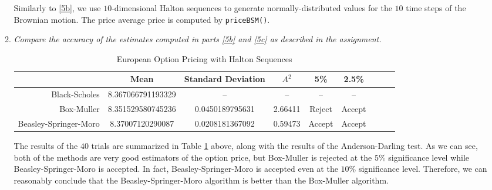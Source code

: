 \documentclass{article}
\begin{document}
\begin{enumerate}
\begin{enumerate}
                Similarly to \ref{5b}, we use $10$-dimensional Halton sequences to generate normally-distributed values for the $10$ time steps of the Brownian motion.
                The price average price is computed by \texttt{priceBSM()}.
            \item \label{5d}
                {\it Compare the accuracy of the estimates computed in parts \ref{5b} and \ref{5c} as described in the assignment.}

                \begin{table}[H]
                    \centering
                    \caption{European Option Pricing with Halton Sequences}
                    \begin{tabular}{|r|c|c|c|c|c|c|c|c|} \hline
                                                & Mean              & Standard Deviation    & $A^2$       & 5\%    & 2.5\%  \\ \hline
                        Black-Scholes           & 8.367066791193329 & --                    & --          & --     & --     \\ \hline
                        Box-Muller              & 8.351529580745236 & 0.0450189795631       & 2.66411     & Reject & Accept \\ \hline
                        Beasley-Springer-Moro   & 8.37007120290087  & 0.0208181367092       & 0.59473     & Accept & Accept \\ \hline
                    \end{tabular}
                    \label{tab:price1}
                \end{table}

                The results of the $40$ trials are summarized in Table \ref{tab:price1} above, along with the results of the Anderson-Darling test.
                As we can see, both of the methods are very good estimators of the option price,
                but Box-Muller is rejected at the $5\%$ significance level while Beasley-Springer-Moro is accepted.
                In fact, Beasley-Springer-Moro is accepted even at the $10\%$ significance level.
                Therefore, we can reasonably conclude that the Beasley-Springer-Moro algorithm is better than the Box-Muller algorithm.
        \end{enumerate}
\end{enumerate}
\end{document}
